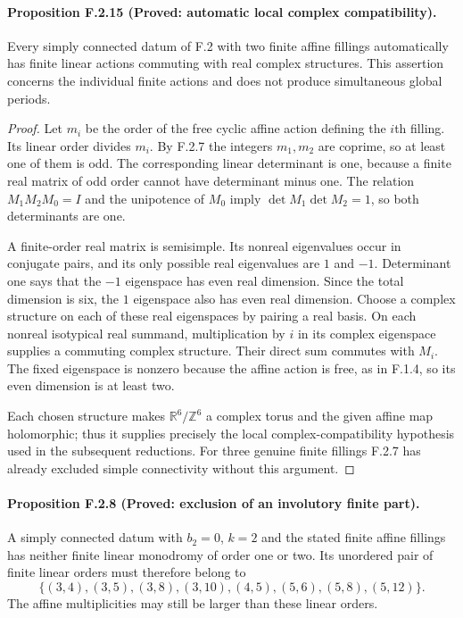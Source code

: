 \paragraph{Proposition F.2.15 (Proved: automatic local complex compatibility).}
Every simply connected datum of F.2 with two finite affine
fillings automatically has finite linear actions commuting
with real complex structures.  This assertion concerns the
individual finite actions and does not produce simultaneous
global periods.

\begin{proof}
Let $m_i$ be the order of the free cyclic affine action
defining the $i$th filling.  Its linear order divides $m_i$.
By F.2.7 the integers $m_1,m_2$ are coprime, so at least one
of them is odd.  The corresponding linear determinant is
one, because a finite real matrix of odd order cannot have
determinant minus one.  The relation
$M_1M_2M_0=I$ and the unipotence of $M_0$ imply
$\det M_1\det M_2=1$, so both determinants are one.

A finite-order real matrix is semisimple.  Its nonreal
eigenvalues occur in conjugate pairs, and its only possible
real eigenvalues are $1$ and $-1$.  Determinant one says
that the $-1$ eigenspace has even real dimension.  Since the
total dimension is six, the $1$ eigenspace also has even
real dimension.  Choose a complex structure on each of
these real eigenspaces by pairing a real basis.  On each
nonreal isotypical real summand, multiplication by $i$ in
its complex eigenspace supplies a commuting complex
structure.  Their direct sum commutes with $M_i$.
The fixed eigenspace is nonzero because the affine action
is free, as in F.1.4, so its even dimension is at least two.

Each chosen structure makes $\mathbb R^6/\mathbb Z^6$ a
complex torus and the given affine map holomorphic; thus it
supplies precisely the local complex-compatibility
hypothesis used in the subsequent reductions.  For three genuine
finite fillings F.2.7 has already excluded simple
connectivity without this argument.
\end{proof}

\paragraph{Proposition F.2.8 (Proved: exclusion of an involutory finite part).}
A simply connected datum with $b_2=0$, $k=2$ and the stated
finite affine fillings has neither finite linear
monodromy of order one or two.  Its unordered pair of finite
linear orders must therefore belong to
\[
 \{(3,4),(3,5),(3,8),(3,10),(4,5),
       (5,6),(5,8),(5,12)\}.
 \tag{F.28}
\]
The affine multiplicities may still be larger than these
linear orders.

